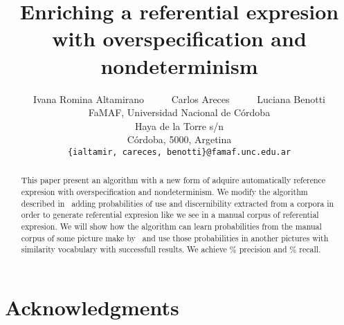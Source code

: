 \documentclass[11pt,letterpaper]{article}
\title{Enriching a referential expresion with overspecification and nondeterminism}
\author{Ivana Romina Altamirano 
	  \ \ \ \ \ 
	Carlos Areces
	  \ \ \ \ \ 
	Luciana Benotti\\
	    FaMAF, Universidad Nacional de C\'ordoba\\
	    Haya de la Torre s/n\\
	    C\'ordoba, 5000, Argetina\\
	    	    {\tt \{ialtamir, careces, benotti\}@famaf.unc.edu.ar}	    }
\date{}
\begin{document}
\maketitle
\begin{abstract}
  This paper present an algorithm with a new form of adquire automatically reference expresion with overspecification and nondeterminism. We modify the algorithm described in~\cite{areces08} adding probabilities of use and discernibility extracted from a corpora in order to generate referential expresion like we see in a manual corpus of referential expresion. We will show how the algorithm can learn probabilities from the manual corpus of some picture make by~\cite{viethen} and use those probabilities in another pictures with similarity vocabulary with successfull results. We achieve \% precision and \% recall. 
\end{abstract}









\section*{Acknowledgments}



\end{document}
